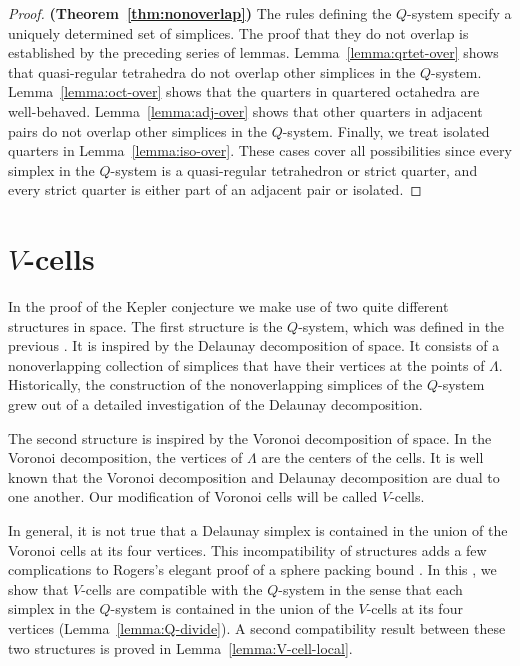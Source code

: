 \begin{proof} {\bf (Theorem~\ref{thm:nonoverlap})}
The rules defining the $Q$-system specify a uniquely determined
set of simplices.  The proof that they do not overlap is
established by the preceding series of lemmas.
Lemma~\ref{lemma:qrtet-over} shows that quasi-regular tetrahedra
do not overlap other simplices in the $Q$-system.
Lemma~\ref{lemma:oct-over} shows that the quarters in quartered
octahedra are well-behaved. Lemma~\ref{lemma:adj-over} shows that
other quarters in adjacent pairs do not overlap other simplices in
the $Q$-system. Finally, we treat isolated quarters in
Lemma~\ref{lemma:iso-over}. These cases cover all possibilities
since every simplex in the $Q$-system is a quasi-regular
tetrahedron or strict quarter, and every strict quarter is either
part of an adjacent pair or isolated.
\end{proof}





\chapter{$V$-cells}
\label{sec:vcells}

In the proof of the Kepler conjecture we make use of two quite
different structures in space.  The first structure is the
$Q$-system, which was defined in the previous \chap.  It is inspired
by the Delaunay decomposition of space. It consists of a
nonoverlapping collection of simplices that have their vertices at
the points of $\Lambda$.  Historically, the construction of the
nonoverlapping simplices of the $Q$-system grew out of a detailed
investigation of the Delaunay decomposition.

The second structure is inspired by the Voronoi decomposition of
space. In the Voronoi decomposition, the vertices of $\Lambda$ are
the centers of the cells.  It is well known that the Voronoi
decomposition and Delaunay decomposition are dual to one another.
Our modification of Voronoi cells will be called $V$-cells.

In general, it is not true that a Delaunay simplex is contained in
the union of the Voronoi cells at its four vertices.  This
incompatibility of structures adds a few complications to Rogers's
elegant proof of a sphere packing bound \cite{Rogers}. In this
\chap, we show that $V$-cells are compatible with the $Q$-system
in the sense that each simplex in the  $Q$-system is contained in
the union of the $V$-cells at its four vertices
(Lemma~\ref{lemma:Q-divide}). A second compatibility result
between these two structures is proved in
Lemma~\ref{lemma:V-cell-local}.

